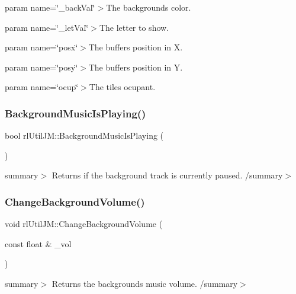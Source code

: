 param name=\char`\"{}\+\_\+back\+Val\char`\"{}$>$The background\textquotesingle{}s color.

param name=\char`\"{}\+\_\+let\+Val\char`\"{}$>$The letter to show.

param name=\char`\"{}posx\char`\"{}$>$The buffer\textquotesingle{}s position in X.

param name=\char`\"{}posy\char`\"{}$>$The buffer\textquotesingle{}s position in Y.

param name=\char`\"{}ocup\char`\"{}$>$The tile\textquotesingle{}s ocupant.\mbox{\label{classrl_util_j_m_a0caa07e32aacb98dc10bff4d83c647c7}} 
\subsubsection{\texorpdfstring{Background\+Music\+Is\+Playing()}{BackgroundMusicIsPlaying()}}
{\footnotesize\ttfamily bool rl\+Util\+J\+M\+::\+Background\+Music\+Is\+Playing (\begin{DoxyParamCaption}{ }\end{DoxyParamCaption})\hspace{0.3cm}{\ttfamily [static]}}

summary$>$ Returns if the background track is currently paused. /summary$>$ \mbox{\label{classrl_util_j_m_adb79c17ae56d7250de66c4b3bbbc0100}} 
\subsubsection{\texorpdfstring{Change\+Background\+Volume()}{ChangeBackgroundVolume()}}
{\footnotesize\ttfamily void rl\+Util\+J\+M\+::\+Change\+Background\+Volume (\begin{DoxyParamCaption}\item[{const float \&}]{\+\_\+vol }\end{DoxyParamCaption})\hspace{0.3cm}{\ttfamily [static]}}

summary$>$ Returns the background\textquotesingle{}s music volume. /summary$>$ \mbox{\label{classrl_util_j_m_afc4417768a9d85a87db09ec0eb7b5f75}} 
